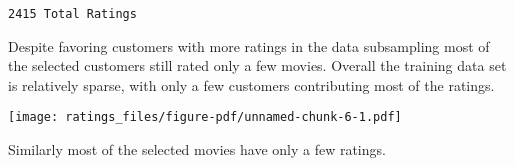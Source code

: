 \documentclass[
  letterpaper,
  DIV=11,
  numbers=noendperiod]{scrartcl}
\newenvironment{Shaded}{\begin{snugshade}}{\end{snugshade}}
\newcommand{\AttributeTok}[1]{\textcolor[rgb]{0.40,0.45,0.13}{#1}}
\newcommand{\DecValTok}[1]{\textcolor[rgb]{0.68,0.00,0.00}{#1}}
\newcommand{\FloatTok}[1]{\textcolor[rgb]{0.68,0.00,0.00}{#1}}
\newcommand{\FunctionTok}[1]{\textcolor[rgb]{0.28,0.35,0.67}{#1}}
\newcommand{\NormalTok}[1]{\textcolor[rgb]{0.00,0.23,0.31}{#1}}
\newcommand{\SpecialCharTok}[1]{\textcolor[rgb]{0.37,0.37,0.37}{#1}}
\newcommand{\StringTok}[1]{\textcolor[rgb]{0.13,0.47,0.30}{#1}}
\begin{document}
\begin{verbatim}
2415 Total Ratings
\end{verbatim}

Despite favoring customers with more ratings in the data subsampling
most of the selected customers still rated only a few movies. Overall
the training data set is relatively sparse, with only a few customers
contributing most of the ratings.

\begin{Shaded}
\end{Shaded}

\texttt{[image: ratings\_files/figure-pdf/unnamed-chunk-6-1.pdf]}

Similarly most of the selected movies have only a few ratings.

\begin{Shaded}
\end{Shaded}
\end{document}
